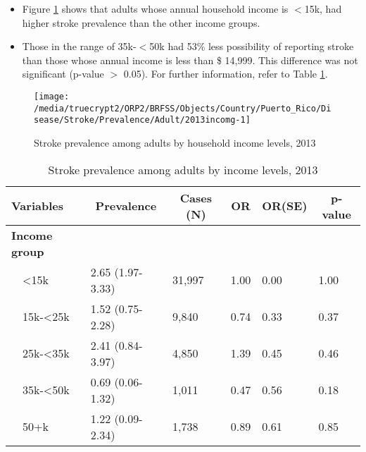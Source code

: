  
 
 \newpage
\begin{itemize}

\item Figure \ref{fig:income.Stroke.2013} shows that adults whose annual household income is 
$<$15k, had higher stroke prevalence than the other income groups.

\item Those in the range of 35k-$<$50k had 53\% less possibility of reporting stroke than those whose annual income is less than \$ 14,999. This difference was not significant (p-value $>$ 0.05).  For further information, refer to Table \ref{tab:income.Stroke.2013}.

\end{itemize}

\begin{figure}[H]
\caption{Stroke prevalence among adults by household income levels, 
         2013}
\begin{knitrout}
\color{fgcolor}

{\centering \texttt{[image: /media/truecrypt2/ORP2/BRFSS/Objects/Country/Puerto\_Rico/Disease/Stroke/Prevalence/Adult/2013incomg-1]} 

}



\end{knitrout}
 \label{fig:income.Stroke.2013}
\end{figure}

\begin{table}[H]
\caption{Stroke prevalence  among adults by income levels, 2013\label{tab:income.Stroke.2013}} 
\begin{center}
\begin{tabular}{llllll}
\hline\hline
\multicolumn{1}{l}{Variables}&\multicolumn{1}{c}{Prevalence}&\multicolumn{1}{c}{Cases (N)}&\multicolumn{1}{c}{OR}&\multicolumn{1}{c}{OR(SE)}&\multicolumn{1}{c}{p-value}\tabularnewline
\hline
{\bfseries Income group}&&&&&\tabularnewline
~~\textless15k&2.65 (1.97-3.33)&31,997&1.00&0.00&1.00\tabularnewline
~~15k-\textless25k&1.52 (0.75-2.28)& 9,840&0.74&0.33&0.37\tabularnewline
~~25k-\textless35k&2.41 (0.84-3.97)& 4,850&1.39&0.45&0.46\tabularnewline
~~35k-\textless50k&0.69 (0.06-1.32)& 1,011&0.47&0.56&0.18\tabularnewline
~~50+k&1.22 (0.09-2.34)& 1,738&0.89&0.61&0.85\tabularnewline
\hline
\end{tabular}\end{center}

\end{table}

